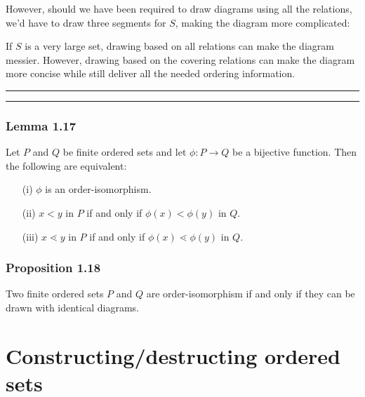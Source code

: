\documentclass[12pt, letterpaper, oneside]{book}
\begin{document}
However, should we have been required to draw diagrams using all the relations, we'd have to draw three segments for
$S$, making the diagram more complicated:


If $S$ is a very large set, drawing based on all relations can make the diagram messier. However, drawing based on the
covering relations can make the diagram more concise while still deliver all the needed ordering information.

\noindent\rule{10cm}{0.4pt}\rule{1cm}{10pt}

\subsubsection{Lemma 1.17}

Let $P$ and $Q$ be finite ordered sets and let $\phi: P \rightarrow Q$ be a bijective function. Then the following are
equivalent:
\begin{enumerate}
  \item[(i)] $\phi$ is an order-isomorphism.
  \item[(ii)] $x < y$ in $P$ if and only if $\phi(x) < \phi(y)$ in $Q$.
  \item[(iii)] $x \lessdot y$ in $P$ if and only if $\phi(x) \lessdot \phi(y)$ in $Q$.
\end{enumerate}

\subsubsection{Proposition 1.18}

Two finite ordered sets $P$ and $Q$ are order-isomorphism if and only if they can be drawn with identical diagrams.

\section{Constructing/destructing ordered sets}
\end{document}

